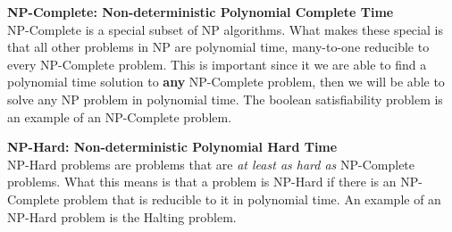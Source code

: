 \documentclass[9pt]{extarticle} %
\begin{document}
\begin{minipage}[t]{.61\linewidth}
\textbf{NP-Complete: Non-deterministic Polynomial Complete Time} \\
NP-Complete is a special subset of NP algorithms. What makes these special is that all other
problems in NP are polynomial time, many-to-one reducible to every NP-Complete problem. This is
important since it we are able to find a polynomial time solution to \textbf{any} NP-Complete
problem, then we will be able to solve any NP problem in polynomial time. The boolean satisfiability
problem is an example of an NP-Complete problem.

\textbf{NP-Hard: Non-deterministic Polynomial Hard Time} \\
NP-Hard problems are problems that are \textit{at least as hard as} NP-Complete problems. What this
means is that a problem is NP-Hard if there is an NP-Complete problem that is reducible to it in
polynomial time. An example of an NP-Hard problem is the Halting problem.


\end{minipage} %
\end{document}
